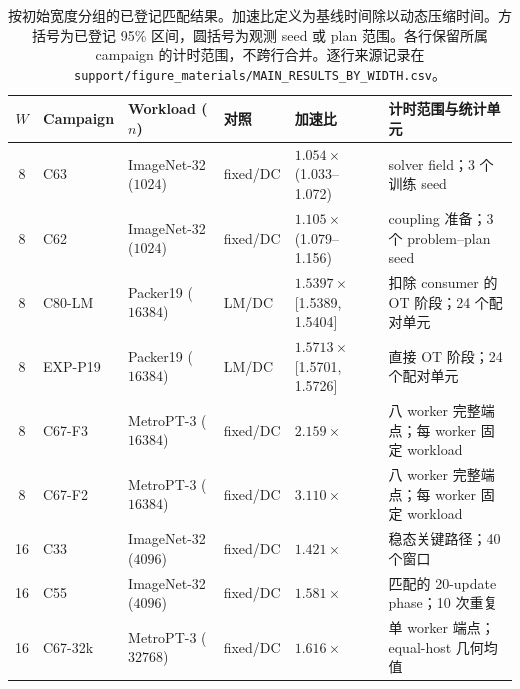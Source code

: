 \begin{table}[!t]
\centering
\caption{按初始宽度分组的已登记匹配结果。加速比定义为基线时间除以动态压缩时间。方括号为已登记 95\% 区间，圆括号为观测 seed 或 plan 范围。各行保留所属 campaign 的计时范围，不跨行合并。逐行来源记录在 \texttt{support/figure\_materials/MAIN\_RESULTS\_BY\_WIDTH.csv}。}
\label{tab:main-results-by-width}
\scriptsize
\setlength{\tabcolsep}{3.3pt}
\begin{tabular}{@{}cllllp{4.0cm}@{}}
\toprule
$W$ & Campaign & Workload ($n$) & 对照 & 加速比 & 计时范围与统计单元 \\
\midrule
8 & C63 & ImageNet-32 ($1024$) & fixed/DC & $1.054\times$ (1.033--1.072) & solver field；3 个训练 seed \\
8 & C62 & ImageNet-32 ($1024$) & fixed/DC & $1.105\times$ (1.079--1.156) & coupling 准备；3 个 problem--plan seed \\
8 & C80-LM & Packer19 ($16384$) & LM/DC & $1.5397\times$ [1.5389, 1.5404] & 扣除 consumer 的 OT 阶段；24 个配对单元 \\
8 & EXP-P19 & Packer19 ($16384$) & LM/DC & $1.5713\times$ [1.5701, 1.5726] & 直接 OT 阶段；24 个配对单元 \\
8 & C67-F3 & MetroPT-3 ($16384$) & fixed/DC & $2.159\times$ & 八 worker 完整端点；每 worker 固定 workload \\
8 & C67-F2 & MetroPT-3 ($16384$) & fixed/DC & $3.110\times$ & 八 worker 完整端点；每 worker 固定 workload \\
\midrule
16 & C33 & ImageNet-32 ($4096$) & fixed/DC & $1.421\times$ & 稳态关键路径；40 个窗口 \\
16 & C55 & ImageNet-32 ($4096$) & fixed/DC & $1.581\times$ & 匹配的 20-update phase；10 次重复 \\
16 & C67-32k & MetroPT-3 ($32768$) & fixed/DC & $1.616\times$ & 单 worker 端点；equal-host 几何均值 \\

\end{tabular}
\end{table}
